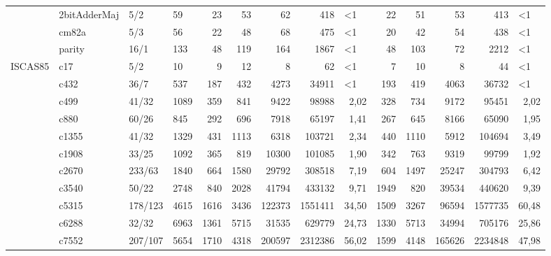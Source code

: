 \begin{sidewaystable}[htbp]
{\begin{tabular}{|r|l|l|l|r|r|r|r|r|r|r|r|r|r|}
		& 2bitAdderMaj & 5/2   & 59    & 23    & 53    & 62    & 418   & \multicolumn{1}{l|}{<1} & 22    & 51    & 53    & 413   & \multicolumn{1}{l|}{<1} \\
		& cm82a & 5/3   & 56    & 22    & 48    & 68    & 475   & \multicolumn{1}{l|}{<1} & 20    & 42    & 54    & 438   & \multicolumn{1}{l|}{<1} \\
		& parity & 16/1  & 133   & 48    & 119   & 164   & 1867  & \multicolumn{1}{l|}{<1} & 48    & 103   & 72    & 2212  & \multicolumn{1}{l|}{<1} \\
		\midrule
		\multicolumn{1}{|l|}{ISCAS85} & c17   & 5/2   & 10    & 9     & 12    & 8     & 62    & \multicolumn{1}{l|}{<1} & 7     & 10    & 8     & 44    & \multicolumn{1}{l|}{<1} \\
		& c432  & 36/7  & 537   & 187   & 432   & 4273  & 34911 & \multicolumn{1}{l|}{<1} & 193   & 419   & 4063  & 36732 & \multicolumn{1}{l|}{<1} \\
		& c499  & 41/32 & 1089  & 359   & 841   & 9422  & 98988 & 2,02  & 328   & 734   & 9172  & 95451 & 2,02 \\
		& c880  & 60/26 & 845   & 292   & 696   & 7918  & 65197 & 1,41  & 267   & 645   & 8166  & 65090 & 1,95 \\
		& c1355 & 41/32 & 1329  & 431   & 1113  & 6318  & 103721 & 2,34  & 440   & 1110  & 5912  & 104694 & 3,49 \\
		& c1908 & 33/25 & 1092  & 365   & 819   & 10300 & 101085 & 1,90  & 342   & 763   & 9319  & 99799 & 1,92 \\
		& c2670 & 233/63 & 1840  & 664   & 1580  & 29792 & 308518 & 7,19  & 604   & 1497  & 25247 & 304793 & 6,42 \\
		& c3540 & 50/22 & 2748  & 840   & 2028  & 41794 & 433132 & 9,71  & 1949  & 820   & 39534 & 440620 & 9,39 \\
		& c5315 & 178/123 & 4615  & 1616  & 3436  & 122373 & 1551411 & 34,50 & 1509  & 3267  & 96594 & 1577735 & 60,48 \\
		& c6288 & 32/32 & 6963  & 1361  & 5715  & 31535 & 629779 & 24,73 & 1330  & 5713  & 34994 & 705176 & 25,86 \\
		& c7552 & 207/107 & 5654  & 1710  & 4318  & 200597 & 2312386 & 56,02 & 1599  & 4148  & 165626 & 2234848 & 47,98 \\
		\bottomrule
	\end{tabular}}%

\end{sidewaystable}%



